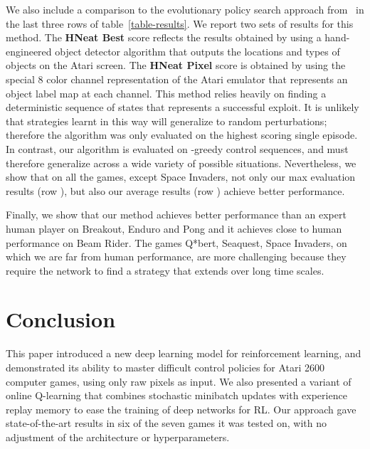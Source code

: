 \documentclass{article} \usepackage{nips13submit_e,times}
\begin{document}
We also include a comparison to the evolutionary policy search approach from~\cite{hausknecht-neuro} in the last three rows of table~\ref{table-results}.   
We report two sets of results for this method. The \textbf{HNeat Best} score reflects the results obtained by using a hand-engineered object detector algorithm that outputs the locations and types of objects on the Atari screen. The \textbf{HNeat Pixel} score is obtained by using the special 8 color channel representation of the Atari emulator that represents an object label map at each channel. 
This method relies heavily on finding a deterministic sequence of states that represents a successful exploit. It is unlikely that strategies learnt in this way will generalize to random perturbations; therefore the algorithm was only evaluated on the highest scoring single episode. In contrast, our algorithm is evaluated on -greedy control sequences, and must therefore generalize across a wide variety of possible situations.  Nevertheless, we show that on all the games, except Space Invaders, not only our max evaluation results (row ), but also our average results (row ) achieve better performance.


Finally, we show that our method achieves better performance than an expert human player on Breakout, Enduro and Pong and it achieves close to human performance on Beam Rider. The games Q*bert, Seaquest, Space Invaders, on which we are far from human performance, are more challenging because they require the network to find a strategy that extends over long time scales.  
 
\vspace{-0.3cm}
\section{Conclusion}
\vspace{-0.2cm}
\label{sec:conclusion}
This paper introduced a new deep learning model for reinforcement learning, and demonstrated its ability to master difficult control policies for Atari 2600 computer games, using only raw pixels as input.
We also presented a variant of online Q-learning that combines stochastic minibatch updates with experience replay memory to ease the training of deep networks for RL.
Our approach gave state-of-the-art results in six of the seven games it was tested on, with no adjustment of the architecture or hyperparameters.


 







\end{document}
